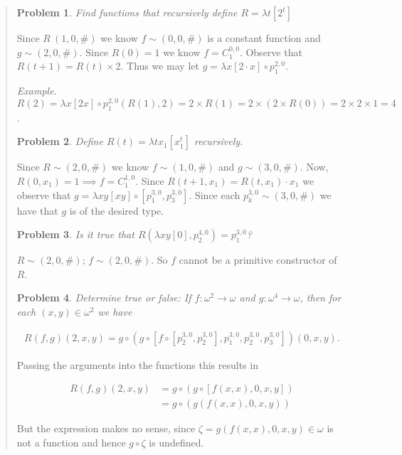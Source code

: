\documentclass[a4paper, 12pt]{article}
\newtheorem{problem}{Problem}
\newtheorem{problem}{Problem}
\begin{document}
\small
\begin{quote}

\begin{problem}
    Find functions that recursively define $R = \lambda t \left[ 2^t \right] $
\end{problem}

Since $R ~ (1, 0, \#)$ we know $f \sim (0, 0, \#)$ is a constant function and $g
\sim (2, 0, \#)$. Since $R(0) = 1$ we know $f = C_{1}^{0, 0}$. Observe that $R(t
+ 1) = R(t) \times 2$. Thus we may let $g = \lambda x [2 \cdot x] \circ
p_{1}^{2, 0}$. 

\textit{Example.} $R(2) = \lambda x[2x] \circ p_1^{2, 0} \left( R(1), 2 \right)
= 2 \times R(1) = 2 \times \left( 2 \times R(0) \right) = 2 \times 2 \times 1 =
4$.

\begin{problem}
    Define $R(t) = \lambda tx_1\left[ x_1^t \right] $ recursively.
\end{problem}

Since $R \sim (2, 0, \#)$ we know $f \sim (1, 0, \#)$ and $g \sim (3, 0, \#)$.
Now, $R(0, x_1) = 1 \implies f = C_{1}^{1, 0}$. Since $R(t + 1, x_1) = R(t, x_1)
\cdot x_1$  we observe that $g = \lambda xy[xy] \circ \left[ p_1^{3, 0},
p_{3}^{3, 0} \right] $. Since each $p_{k}^{3, 0} \sim (3, 0, \#)$ we have that
$g$ is of the desired type.

\begin{problem}
    Is it true that $R(\lambda xy[0], p_2^{4, 0}) = p_1^{3, 0}$?
\end{problem}

$R \sim (2, 0, \#)$; $f \sim (2, 0, \#)$. So $f$ cannot be a primitive
constructor of $R$.

\begin{problem}
    Determine true or false: If $f : \omega^2 \to \omega$ and $g : \omega^4 \to
    \omega$, then for each $(x, y) \in \omega^2$ we have

    \begin{align*}
        R(f, g)(2, x, y) = g \circ \left( g \circ \left[ f \circ \left[ p_2^{3,
        0}, p_2^{3, 0} \right], p_1^{3, 0}, p_2^{3, 0}, p_3^{3, 0}  \right]
    \right) (0, x, y).
    \end{align*}
\end{problem}

Passing the arguments into the functions this results in 

\begin{align*}
    R(f, g)(2, x, y) &= g \circ \left( g \circ \left[ f(x, x) , 0, x, y
    \right]\right)  \\ 
                     &= g \circ \left( g \left( f(x, x), 0, x, y \right)
                     \right)
\end{align*}

But the expression makes no sense, since $\zeta = g(f(x, x), 0, x, y) \in
\omega$ is not a function and hence $g \circ \zeta$ is undefined.

\end{quote}
\normalsize
\end{document}
